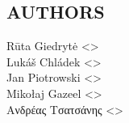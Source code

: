 \documentclass[a4paper,english]{article}
\begin{document}
\begin{adjustwidth}{18pt}{0pt}


    \section{AUTHORS}
    Rūta Giedrytė <>\\[0.1cm]\MANbr
    Lukáš Chládek <>\\[0.1cm]\MANbr
    Jan Piotrowski <>\\[0.1cm]\MANbr
    Mikołaj Gazeel <>\\[0.1cm]\MANbr
    Ανδρέας Τσατσάνης <>\\[0.1cm]\MANbr

\end{adjustwidth}
\end{document}
